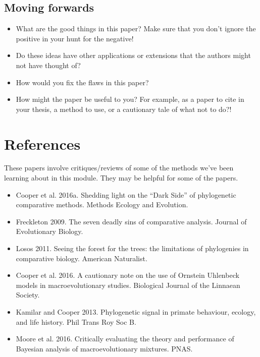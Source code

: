 \documentclass[]{book}
\providecommand{\tightlist}{%
  \setlength{\itemsep}{0pt}\setlength{\parskip}{0pt}}
\begin{document}
\subsection{Moving forwards}\label{moving-forwards}

\begin{itemize}
\item
  What are the good things in this paper? Make sure that you don't
  ignore the positive in your hunt for the negative!
\item
  Do these ideas have other applications or extensions that the authors
  might not have thought of?
\item
  How would you fix the flaws in this paper?
\item
  How might the paper be useful to you? For example, as a paper to cite
  in your thesis, a method to use, or a cautionary tale of what not to
  do?!
\end{itemize}

\section{References}\label{references-6}

These papers involve critiques/reviews of some of the methods we've been
learning about in this module. They may be helpful for some of the
papers.

\begin{itemize}
\tightlist
\item
  Cooper et al. 2016a. Shedding light on the ``Dark Side'' of
  phylogenetic comparative methods. Methods Ecology and Evolution.
\item
  Freckleton 2009. The seven deadly sins of comparative analysis.
  Journal of Evolutionary Biology.
\item
  Losos 2011. Seeing the forest for the trees: the limitations of
  phylogenies in comparative biology. American Naturalist.
\item
  Cooper et al. 2016. A cautionary note on the use of Ornstein Uhlenbeck
  models in macroevolutionary studies. Biological Journal of the
  Linnaean Society.
\item
  Kamilar and Cooper 2013. Phylogenetic signal in primate behaviour,
  ecology, and life history. Phil Trans Roy Soc B.
\item
  Moore et al. 2016. Critically evaluating the theory and performance of
  Bayesian analysis of macroevolutionary mixtures. PNAS.
\end{itemize}
\end{document}
